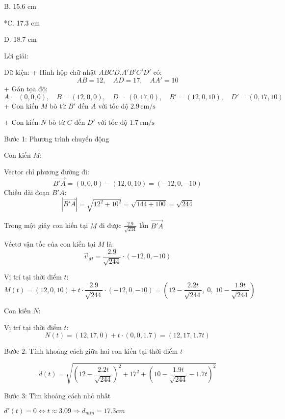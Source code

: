 \documentclass[a4paper,12pt]{article}
\begin{document}
B. 15.6 cm

*C. 17.3 cm

D. 18.7 cm

Lời giải:


Dữ kiện:
+ Hình hộp chữ nhật \(ABCD.A'B'C'D'\) có:
\[
AB = 12,\quad AD = 17,\quad AA' = 10
\]
+ Gán tọa độ:
\[
A = (0, 0, 0),\quad B = (12, 0, 0),\quad D = (0, 17, 0),\quad B' = (12, 0, 10),\quad D' = (0, 17, 10)
\]
+ Con kiến \(M\) bò từ \(B'\) đến \(A\) với tốc độ \(2.9\, \text{cm/s}\)

+ Con kiến \(N\) bò từ \(C\) đến \(D'\) với tốc độ \(1.7\, \text{cm/s}\)

Bước 1: Phương trình chuyển động

Con kiến \(M\):

Vector chỉ phương đường đi:
\[
\overrightarrow{B'A} = (0, 0, 0) - (12, 0, 10) = ( -12, 0, -10 )
\]
Chiều dài đoạn \(B'A\):
\[
|\overrightarrow{B'A}| = \sqrt{12^2 + 10^2} = \sqrt{144 + 100} = \sqrt{244}
\]

Trong một giây con kiến tại \(M\) đi được \(\frac{2.9}{\sqrt{244}}\) lần \(\overrightarrow{B'A}\)

Véctơ vận tốc của con kiến tại \(M\) là:
\[
\overrightarrow{v}_M = \frac{2.9}{\sqrt{244}} \cdot ( -12, 0, -10 )
\]

Vị trí tại thời điểm \(t\):
\[
M(t) = (12, 0, 10) + t \cdot \frac{2.9}{\sqrt{244}} \cdot ( -12, 0, -10 )
= \left( 12 - \frac{2.2t}{\sqrt{244}},\; 0,\; 10 - \frac{1.9t}{\sqrt{244}} \right)
\]

Con kiến \(N\):

Vị trí tại thời điểm \(t\):
\[
N(t) = (12, 17, 0) + t \cdot (0, 0, 1.7) = (12, 17, 1.7t)
\]

Bước 2: Tính khoảng cách giữa hai con kiến tại thời điểm \(t\)

\[
d(t) = \sqrt{\left(12 - \frac{2.2t}{\sqrt{244}}\right)^2 + 17^2 + \left(10 - \frac{1.9t}{\sqrt{244}} - 1.7t\right)^2}
\]

Bước 3: Tìm khoảng cách nhỏ nhất

\(d'(t)=0\Leftrightarrow t \approx 3.09 \Rightarrow d_{min}=17.3cm\)
\end{document}
